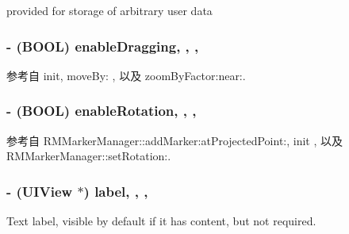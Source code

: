 provided for storage of arbitrary user data 

\hypertarget{interface_r_m_marker_abdaaec7c6a67902e90e95c072ca19f0a}{
\subsubsection[{enable\-Dragging}]{\setlength{\rightskip}{0pt plus 5cm}-\/ (B\-O\-O\-L) enable\-Dragging\hspace{0.3cm}{\ttfamily [read]}, {\ttfamily [write]}, {\ttfamily [atomic]}, {\ttfamily [assign]}}}\label{interface_r_m_marker_abdaaec7c6a67902e90e95c072ca19f0a}


参考自 init, move\-By\-: , 以及 zoom\-By\-Factor\-:near\-:.

\hypertarget{interface_r_m_marker_afba7d967f0f18ec0d5dc668a9a3e27ff}{
\subsubsection[{enable\-Rotation}]{\setlength{\rightskip}{0pt plus 5cm}-\/ (B\-O\-O\-L) enable\-Rotation\hspace{0.3cm}{\ttfamily [read]}, {\ttfamily [write]}, {\ttfamily [atomic]}, {\ttfamily [assign]}}}\label{interface_r_m_marker_afba7d967f0f18ec0d5dc668a9a3e27ff}


参考自 R\-M\-Marker\-Manager\-::add\-Marker\-:at\-Projected\-Point\-:, init , 以及 R\-M\-Marker\-Manager\-::set\-Rotation\-:.

\hypertarget{interface_r_m_marker_a8eb1ce06dea5a1c89feb3b7b8c7de25c}{
\subsubsection[{label}]{\setlength{\rightskip}{0pt plus 5cm}-\/ (U\-I\-View $\ast$) label\hspace{0.3cm}{\ttfamily [read]}, {\ttfamily [write]}, {\ttfamily [nonatomic]}, {\ttfamily [retain]}}}\label{interface_r_m_marker_a8eb1ce06dea5a1c89feb3b7b8c7de25c}


Text label, visible by default if it has content, but not required. 



